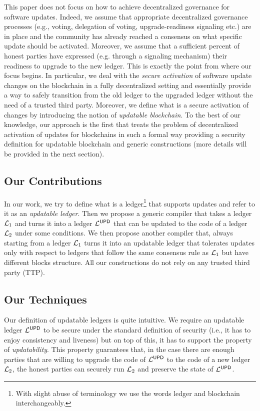 This paper does not focus on how to achieve decentralized governance for 
software updates. Indeed, we assume that appropriate decentralized governance processes (e.g., voting, 
delegation of voting, upgrade-readiness signaling etc.) are in place and the 
community has already reached a 
consensus on what specific update should be activated. Moreover, we assume that 
a sufficient percent of honest parties have expressed (e.g. through a signaling 
mechanism) their readiness to upgrade to the new ledger. This is exactly the 
point from where our focus begins. In particular, we deal with the \emph{secure 
activation} of software update changes on the blockchain in a fully 
decentralized setting and essentially 
provide a way to safely transition from the old ledger to the upgraded ledger 
without the need of a trusted third party. Moreover, we define what is a secure 
activation of changes by introducing the notion of \emph{updatable blockchain}. 
To the best of our knowledge, our approach is the first that treats the problem 
of decentralized activation of updates for blockchains in such a formal way 
providing a security definition for updatable blockchain and generic 
constructions (more details will be provided in the next section).


\subsection{Our Contributions}
In our work, we try to define what is a ledger\footnote{With slight abuse of terminology we use the words 
ledger and blockchain interchangeably.} that supports updates and refer to it as an \emph{updatable ledger}.
Then we propose a generic compiler that takes a ledger $\mathcal{L}_1$ and turns it into a ledger $\mathcal{L}^\mathsf{UPD}$
that can be updated to the code of a ledger $\mathcal{L}_2$ under some conditions.
We then propose another compiler that, always starting from a ledger $\mathcal{L}_1$ turns it into an updatable ledger that tolerates updates only with respect to ledgers that follow the same consensus rule as $\mathcal{L}_1$ but have different blocks structure. All our constructions do not rely on any trusted third party (TTP).

\subsection{Our Techniques} Our definition of updatable ledgers is quite intuitive. We require
an updatable ledger $\mathcal{L}^\mathsf{UPD}$ to be secure under the standard definition of security (i.e., it has to enjoy consistency and liveness) but on top of this, it has to support the property of \emph{updatability}. 
This property guarantees that, in the case there are  enough parties that are willing to upgrade 
the code of $\mathcal{L}^\mathsf{UPD}$ to the code of a new ledger $\mathcal{L}_2$, the honest parties can securely run $\mathcal{L}_2$
and preserve the state of $\mathcal{L}^\mathsf{UPD}$.


